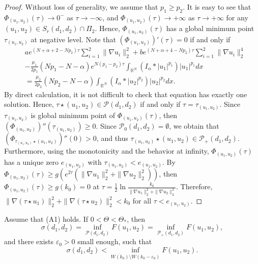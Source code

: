 \documentclass[reqno]{amsart}
\begin{document}
\begin{proof}
Without loss of generality, we assume that $p_1\geq p_2$. It is easy to see that 
$\Phi_{(u_1,u_2)}(\tau)\to 0^-$ as $\tau\to -\infty$,
and $\Phi_{(u_1,u_2)}(\tau)\to +\infty$ as $\tau\to +\infty$ for any 
$(u_1,u_2)\in S_r(d_1,d_2)\cap\varPi_2$. Hence, $\Phi_{(u_1,u_2)}(\tau)$ has
a global minimum point $\tau_{(u_1,u_2)}$ at negative level. Note that 
$(\Phi_{(u_1,u_2)})'(\tau)=0$ if and only if
\begin{align*}
&ae^{(N+\alpha+2-Np_2)\tau}\sum_{i=1}^2\| \nabla u_i\|_2^2
 +be^{(N+\alpha+4-Np_2)\tau}\sum_{i=1}^2\| \nabla u_i\|_2^4\\
&-\frac{\mu_1}{2p_1}(Np_1-N-\alpha)e^{N(p_1-p_2)\tau}
 \int_{\mathbb{R}^N}(I_\alpha\ast|u_1|^{p_1})|u_1|^{p_1}dx \\
&=\frac{\mu_2}{2p_2}(Np_2-N-\alpha)\int_{\mathbb{R}^N}(I_\alpha\ast|u_2|^{p_2})
 |u_2|^{p_2}dx.
\end{align*}
By direct calculation, it is not difficult to check that equation has exactly one 
solution. Hence, $\tau\star(u_1,u_2)\in\mathcal{P}(d_1,d_2)$
if and only if $\tau=\tau_{(u_1,u_2)}$. Since $\tau_{(u_1,u_2)}$ is global minimum 
point of $\Phi_{(u_1,u_2)}(\tau)$, then $(\Phi_{(u_1,u_2)})''(\tau_{(u_1,u_2)})\geq0$.
Since $\mathcal{P}_0(d_1,d_2)=\emptyset$, we obtain that 
$(\Phi_{\tau_{(u_1,u_2)}\star(u_1,u_2)})''(0)>0$, and thus 
$\tau_{(u_1,u_2)}\star(u_1,u_2)\in\mathcal{P}_+(d_1,d_2)$.
Furthermore, using the monotonicity and the behavior at infinity, 
$\Phi_{(u_1,u_2)}(\tau)$ has a unique zero $e_{(u_1,u_2)}$ with 
$\tau_{(u_1,u_2)}<e_{(u_1,u_2)}$.
By $\Phi_{(u_1,u_2)}(\tau)\geq g(e^{2\tau}(\| \nabla u_1\|_2^2+\| \nabla u_2\|_2^2))$, 
then $\Phi_{(u_1,u_2)}(\tau)\geq g(k_0)=0$ at 
$\tau=\frac{1}{2}\ln\frac{k_0}{\| \nabla u_1\|_2^2+\| \nabla u_2\|_2^2}$.
Therefore, $\| \nabla(\tau\star u_1)\|_2^2+\| \nabla(\tau\star u_2)\|_2^2<k_0$ 
for all $\tau<e_{(u_1,u_2)}$.
\end{proof}

\begin{lemma}\label{xiajy2}
Assume that {\rm (A1)} holds. If $0<\Theta<\Theta_*$, then
\[
\sigma(d_1,d_2)=\inf_{\mathcal{P}(d_1,d_2)}F(u_1,u_2)=\inf_{\mathcal{P}_+(d_1,d_2)}F(u_1,u_2),
\]
and there exists $\varepsilon_0>0$ small enough, such that
\[
\sigma(d_1,d_2)<\inf_{\overline{W(k_0)} \setminus W(k_0-\varepsilon_0)}F(u_1,u_2).
\]
\end{lemma}
\end{document}
